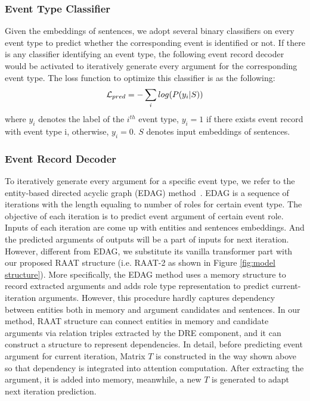 \documentclass[11pt]{article}
\begin{document}
\subsubsection{Event Type Classifier}

Given the embeddings of sentences, we adopt several binary classifiers on every event type to predict whether the corresponding event is identified or not. If there is any classifier identifying an event type, the following event record decoder would be activated to iteratively generate every argument for the corresponding event type. The loss function to optimize this classifier is as the following:
\begin{equation}
\small
    \mathcal{L}_{pred}= - \sum_i log(P(y_i|S))
\end{equation}
where $y_i$ denotes the label of the $i^{th}$ event type, $y_i = 1$ if there exists event record with event type i, otherwise, $y_i = 0$. $S$ denotes input embeddings of sentences.



\subsubsection{Event Record Decoder}

To iteratively generate every argument for a specific event type, we refer to the entity-based directed acyclic graph (EDAG) method~\cite{Doc2EDAG}. EDAG is a sequence of iterations with the length equaling to number of roles for certain event type. The objective of each iteration is to predict event argument of certain event role.
Inputs of each iteration are come up with entities and sentences embeddings. And the predicted arguments of outputs will be a part of inputs for next iteration. However, different from EDAG, we substitute its vanilla transformer part with our proposed RAAT structure (i.e. RAAT-2 as shown in Figure \ref{fig:model structure}). More specifically, the EDAG method uses a memory structure to record extracted arguments and adds role type representation to predict current-iteration arguments. However, this procedure hardly captures dependency between entities both in memory and argument candidates and sentences. In our method, RAAT structure can connect entities in memory and candidate arguments via relation triples extracted by the DRE component, and it can construct a structure to represent dependencies. In detail, before predicting event argument for current iteration, Matrix $T$ is constructed in the way shown above so that dependency is integrated into attention computation. After extracting the argument, it is added into memory, meanwhile, a new $T$ is generated to adapt next iteration prediction.
\end{document}
